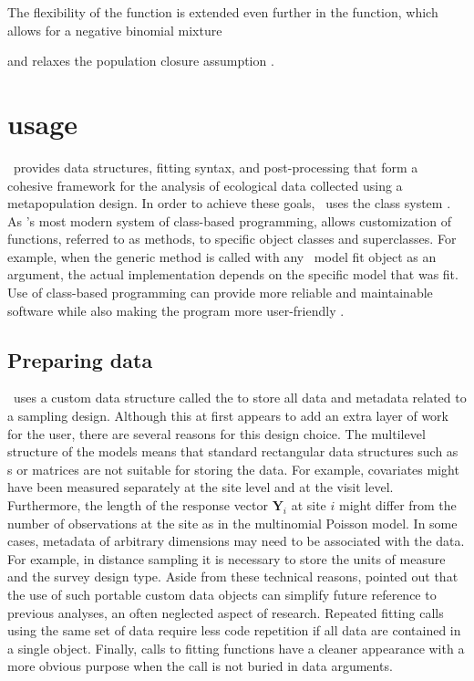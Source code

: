 \documentclass[article,shortnames]{jss}
\newcommand{\um}{\pkg{unmarked}}
\newcommand{\rlang}{\proglang{R}}
\begin{document}
The flexibility of the  function is extended even
further in the  function, which allows for a negative binomial
mixture {\citep{DorazioEA05} and relaxes the population closure assumption
\citep{chandlerEA_TempEm}.

\section[unmarked usage]{ usage}
\label{sec:unmarked-usage}

\um\ provides data structures, fitting syntax, and post-processing that form a
cohesive framework for the analysis of ecological data collected using
a metapopulation design. In order to achieve these goals, \um\ uses the 
class system \citep{Chambers2008}. As \rlang's most modern system of class-based
programming,  allows customization of functions, referred to as
methods, to specific object classes and superclasses. For example,
when the generic  method is called with any \um\ model
fit object as an argument, the actual  implementation
depends on the specific model that was fit.  Use of class-based
programming can provide more reliable and maintainable software while
also making the program more user-friendly \citep{Chambers2008}.


\subsection{Preparing data}
\label{sec:data-requirements}

\um\ uses a custom  data structure called the 
to store all data and metadata related to a sampling design.  Although this at
first appears to add an extra layer of work for the user, there are
several reasons for this design choice.  The multilevel structure of
the models means that standard rectangular data structures such as
s or matrices are not suitable for storing the data.  For
example, covariates might have been measured separately at the site
level and at the visit level.  Furthermore, the length of the response
vector $\mathbf Y_{i}$ at site $i$ might differ from the number of
observations at the site as in the multinomial Poisson model.  In some
cases, metadata of arbitrary dimensions may need to be associated with the
data.  For example, in distance sampling it is necessary to store the units
of measure and the survey design type.  Aside
from these technical reasons, \citet{Gentleman2009} pointed out that
the use of such portable custom data objects can simplify future
reference to previous analyses, an often neglected aspect of research.
Repeated fitting calls using the same set of data require less code
repetition if all data are contained in a single object.  Finally,
calls to fitting functions have a cleaner appearance with a more
obvious purpose when the call is not buried in data arguments.

}
\end{document}
